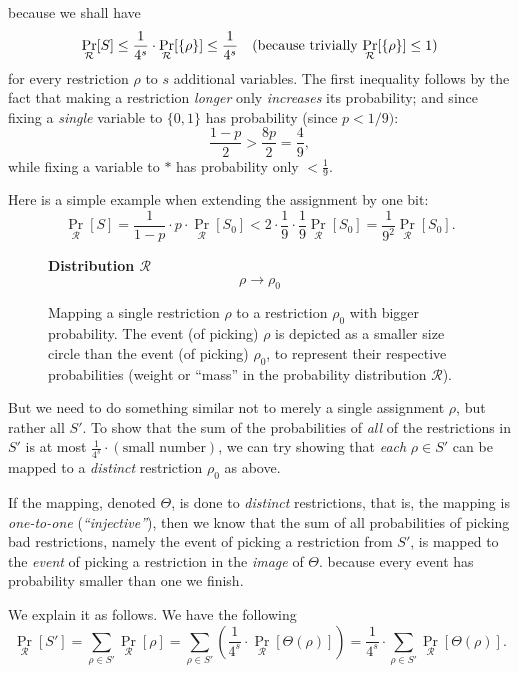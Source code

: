  because we shall have 
\[
\Pr_{\mathcal{R}}[S] \leq \frac{1}{4^s}\cdot \Pr_{\mathcal{R}}[\{\rho\}] \leq \frac{1}{4^s} 
\quad \text{(because trivially \( \Pr_{\mathcal{R}}[\{\rho\}] \leq 1\))}
\]
for every restriction \( \rho \) to \( s \) additional variables.
The first inequality follows by the fact that making a restriction \emph{longer} 
only \emph{increases} its probability; and  since fixing a \emph{single} variable 
to \( \{0,1\} \) has probability (since $p<1/9)$: 
\[
\frac{1 - p}{2} > \frac{8p}{2} = \frac{4}{9},
\]
while fixing a variable to \( * \) has probability only \( < \frac{1}{9} \).

Here is a simple example when extending the assignment by one bit:
\[
\Pr_{\mathcal{R}}[S] = \frac{1}{1 - p} \cdot p \cdot \Pr_{\mathcal{R}}[S_0] 
< 2 \cdot \frac{1}{9} \cdot \frac{1}{9} \Pr_{\mathcal{R}}[S_0] 
= \frac{1}{9^2} \Pr_{\mathcal{R}}[S_0].
\]

\begin{figure}
\centering
\textbf{Distribution \( \mathcal{R} \)}
\[
\rho \longrightarrow \rho_0
\]
\caption{Mapping a single restriction \( \rho \) to a restriction \( \rho_0 \) with bigger probability.
The event (of picking) \( \rho \) is depicted as a smaller size circle than the event (of picking) \( \rho_0 \),
to represent their respective probabilities (weight or ``mass'' in the probability distribution \( \mathcal{R} \)).}
\end{figure}
 

But we need to do something similar not to merely a single assignment \( \rho \), but rather all \( S' \).
To show that the sum of the probabilities of \emph{all} of the restrictions in \( S' \) is at most 
\(\frac{1}{4^s} \cdot (\text{small number})\), we can try showing that \emph{each} \( \rho \in S' \) can be mapped to a 
\emph{distinct} restriction \( \rho_0 \) as above. 

If the mapping, denoted \( \Theta \), is done to \emph{distinct} restrictions, that is, the mapping is 
\emph{one-to-one} (\emph{``injective''}), then we know that the sum of all probabilities of picking bad restrictions, 
namely the event of picking a restriction from \( S' \), is mapped to the \emph{event} of picking a restriction in the 
\emph{image} of \( \Theta \).
because every event has probability smaller than one we finish. 

We explain it as follows. We have the following 
\[
\Pr_{\mathcal{R}}[S'] = \sum_{\rho \in S'} \Pr_{\mathcal{R}}[\rho] = 
\sum_{\rho \in S'} \left(\frac{1}{4^s} \cdot \Pr_{\mathcal{R}}[\Theta(\rho)]\right) =
\frac{1}{4^s} \cdot \sum_{\rho \in S'} \Pr_{\mathcal{R}}[\Theta(\rho)].
\]

